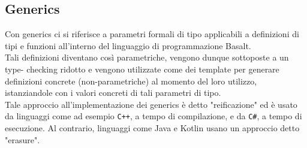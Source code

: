 \subsection{Generics}
Con generics ci si riferisce a parametri formali di tipo applicabili a definizioni di tipi e
funzioni all’interno del linguaggio di programmazione Basalt. \\

Tali definizioni diventano così parametriche, vengono dunque sottoposte a un type-
checking ridotto e vengono utilizzate come dei template per generare definizioni concrete
(non-parametriche) al momento del loro utilizzo, istanziandole con i valori concreti di tali
parametri di tipo. \\

Tale approccio all’implementazione dei generics è detto "reificazione" ed è usato da
linguaggi come ad esempio \texttt{C++}, a tempo di compilazione, e da \texttt{C\#}, a tempo di esecuzione. Al 
contrario, linguaggi come Java e Kotlin usano un approccio detto "erasure".






\newpage

